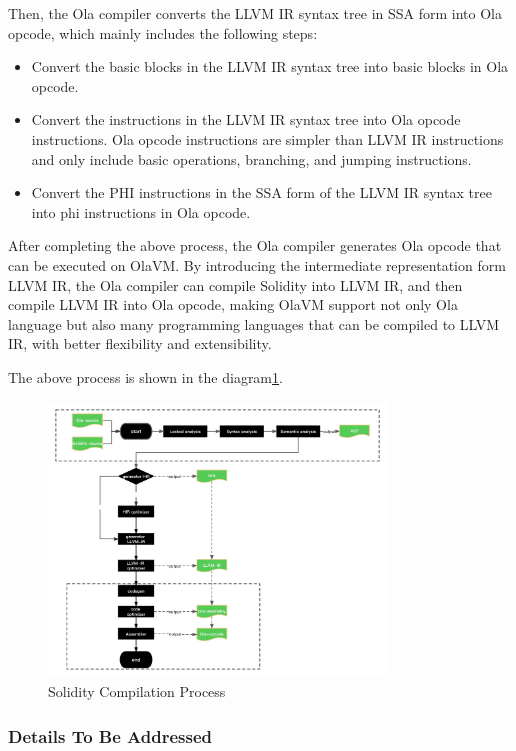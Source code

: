 Then, the Ola compiler converts the LLVM IR syntax tree in SSA form into Ola opcode, which mainly includes the following steps:
\begin{itemize}
    \item Convert the basic blocks in the LLVM IR syntax tree into basic blocks in Ola opcode.
    \item Convert the instructions in the LLVM IR syntax tree into Ola opcode instructions. Ola opcode instructions are simpler than LLVM IR instructions and only include basic operations, branching, and jumping instructions.
    \item Convert the PHI instructions in the SSA form of the LLVM IR syntax tree into phi instructions in Ola opcode.
\end{itemize}
After completing the above process, the Ola compiler generates Ola opcode that can be executed on OlaVM. By introducing the intermediate representation form LLVM IR, the Ola compiler can compile Solidity into LLVM IR, and then compile LLVM IR into Ola opcode, making OlaVM support not only Ola language but also many programming languages that can be compiled to LLVM IR, with better flexibility and extensibility.

The above process is shown in the diagram\ref{fig:solidity-compile}.

\begin{figure}[!ht]
    \centering
    \includegraphics[width=0.8\textwidth]{images/solidity-compile.jpg}
    \caption{Solidity Compilation Process}
    \label{fig:solidity-compile}
\end{figure}

\subsubsection{Details To Be Addressed}

